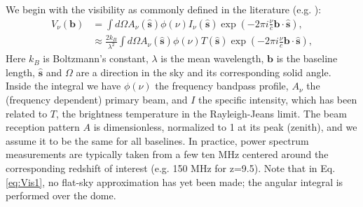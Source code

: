 \documentclass[twocolumn,apj,numberedappendix]{emulateapj}
\renewcommand\[{\begin{equation}}
\renewcommand\]{\end{equation}}
\begin{document}
We begin with the visibility as commonly defined in the literature (e.g.
\citealt{first-paper}): 
\begin{equation}
\begin{aligned}V_{\nu}(\boldsymbol{b}) & =\int d\Omega A_{\nu}(\hat{\boldsymbol{s}})\phi(\nu)I_{\nu}(\hat{\boldsymbol{s}})\exp\left(-2\pi i\frac{\nu}{c}\boldsymbol{b}\cdot\hat{\boldsymbol{s}}\right),\\
 & \approx\frac{2k_{B}}{\lambda^{2}}\int d\Omega A_{\nu}(\hat{\boldsymbol{s}})\phi(\nu)T(\hat{\boldsymbol{s}})\exp\left(-2\pi i\frac{\nu}{c}\boldsymbol{b}\cdot\hat{\boldsymbol{s}}\right),
\end{aligned}
\label{eq:Vis1}
\end{equation}
Here $k_B$ is Boltzmann's constant, $\lambda$ is the mean wavelength, $\boldsymbol{b}$ is the baseline
length, $\hat{\boldsymbol{s}}$ and $\Omega$ are a direction in the
sky and its corresponding solid angle. Inside the integral we have $\phi(\nu)$ the frequency bandpass profile, $A_{\nu}$ the (frequency
dependent) primary beam, and $I$ the specific intensity, which has been
related to $T$, the brightness temperature in the Rayleigh-Jeans
limit. The beam reception pattern $A$ is dimensionless,
normalized to 1 at its peak (zenith), and we assume it to be the same
for all baselines. In practice,
power spectrum measurements are typically taken from a few ten MHz centered around the corresponding redshift of interest (e.g. 150 MHz for z=9.5). Note that in Eq. \ref{eq:Vis1}, no flat-sky approximation has yet been made; the angular integral is performed over the dome. 
\end{document}
